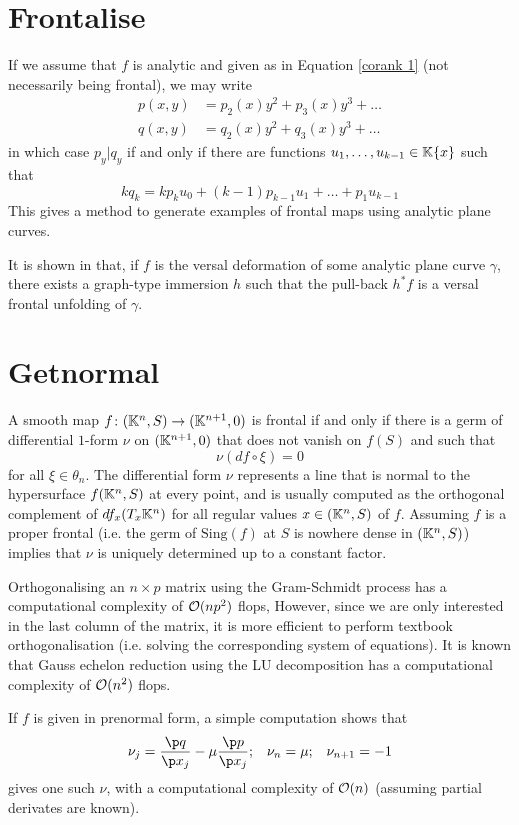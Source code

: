 \documentclass[
]{kaohandt}
\begin{document}
\section{Frontalise}
If we assume that $f$ is analytic and given as in Equation \eqref{corank 1} (not necessarily being frontal), we may write
	\begin{align*}
		p(x,y)&=p_2(x)y^2+p_3(x)y^3+\dots\\
		q(x,y)&=q_2(x)y^2+q_3(x)y^3+\dots
	\end{align*}
in which case $p_y|q_y$ if and only if there are functions $u_1,\dots, u_{k-1} \in \mathbb{K}\{x\}$ such that
	\[kq_k=kp_ku_0+(k-1)p_{k-1}u_1+\dots+p_1u_{k-1}\]
This gives a method to generate examples of frontal maps using analytic plane curves.

It is shown in  that, if $f$ is the versal deformation of some analytic plane curve $\gamma$, there exists a graph-type immersion $h$ such that the pull-back $h^*f$ is a versal frontal unfolding of $\gamma$.

\section{Getnormal}
A smooth map $f\colon (\mathbb{K}^n,S) \to (\mathbb{K}^{n+1},0)$ is frontal if and only if there is a germ of differential $1$-form $\nu$ on $(\mathbb{K}^{n+1},0)$ that does not vanish on $f(S)$ and such that
	\[\nu(df \circ \xi)=0\]
for all $\xi \in \theta_n$.
The differential form $\nu$ represents a line that is normal to the hypersurface $f(\mathbb{K}^n,S)$ at every point, and is usually computed as the orthogonal complement of $df_x(T_x\mathbb{K}^n)$ for all regular values $x \in (\mathbb{K}^n,S)$ of $f$.
Assuming $f$ is a proper frontal (i.e. the germ of $\mathrm{Sing}(f)$ at $S$ is nowhere dense in $(\mathbb{K}^n,S)$) implies that $\nu$ is uniquely determined up to a constant factor.

Orthogonalising an $n\times p$ matrix using the Gram-Schmidt process has a computational complexity of $\mathcal{O}(np^2)$ flops,
However, since we are only interested in the last column of the matrix, it is more efficient to perform textbook orthogonalisation (i.e. solving the corresponding system of equations).
It is known that Gauss echelon reduction using the LU decomposition has a computational complexity of $\mathcal{O}(n^2)$ flops.

If $f$ is given in prenormal form, a simple computation shows that
\begin{align*}
	\nu_j=\frac{\p q}{\p x_j}-\mu\frac{\p p}{\p x_j}; && \nu_n=\mu; && \nu_{n+1}=-1
\end{align*}
gives one such $\nu$, with a computational complexity of $\mathcal{O}(n)$ (assuming partial derivates are known).
\end{document}
